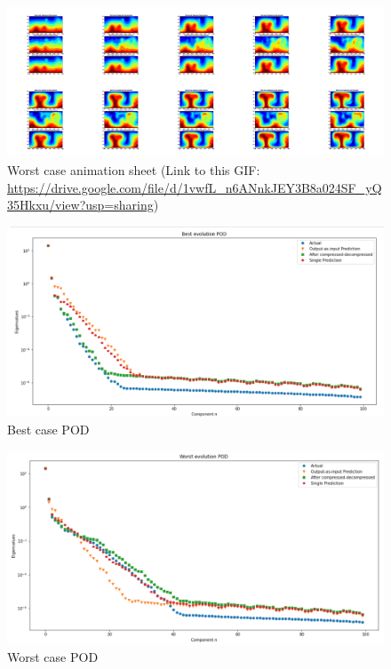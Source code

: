 \begin{figure}[H]
    \centering
    \caption{Worst case animation sheet (Link to this GIF: 
    \url{https://drive.google.com/file/d/1vwfL_n6ANnkJEY3B8a024SF_yQ35Hkxu/view?usp=sharing})}
    \includegraphics[scale=0.10]{Report LaTeX/figures/mantle_convection_images/larger_dataset/FNN_Worst_GIF_sheet.png}
\end{figure}


\begin{figure}[H]
    \caption{Best case POD}
    \includegraphics[scale=0.5]{Report LaTeX/figures/mantle_convection_images/larger_dataset/FNN_Best_POD.png}
\end{figure}

\begin{figure}[H]
    \caption{Worst case POD}
    \includegraphics[scale=0.5]{Report LaTeX/figures/mantle_convection_images/larger_dataset/FNN_Worst_POD.png}
\end{figure}

